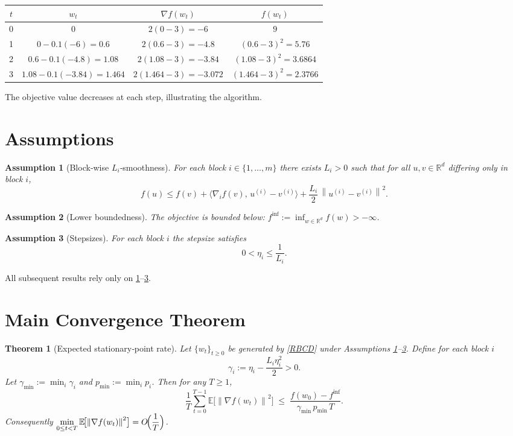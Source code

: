 \documentclass{article}
\newtheorem{theorem}{Theorem}
\newtheorem{assumption}{Assumption}
\newcommand{\E}{\mathbb{E}}
\newcommand{\R}{\mathbb{R}}
\newcommand{\norm}[1]{\left\lVert #1\right\rVert}
\begin{document}
\begin{center}
\begin{tabular}{c|c|c|c}
$t$ & $w_t$ & $\nabla f(w_t)$ & $f(w_t)$\\ \hline
0 & $0$ & $2(0-3)=-6$ & $9$\\
1 & $0-0.1(-6)=0.6$ & $2(0.6-3)=-4.8$ & $(0.6-3)^2=5.76$\\
2 & $0.6-0.1(-4.8)=1.08$ & $2(1.08-3)=-3.84$ & $(1.08-3)^2=3.6864$\\
3 & $1.08-0.1(-3.84)=1.464$ & $2(1.464-3)=-3.072$ & $(1.464-3)^2=2.3766$
\end{tabular}
\end{center}
The objective value decreases at each step, illustrating the algorithm.

\newpage
\section*{Assumptions}
\begin{assumption}[Block‑wise $L_i$‑smoothness]\label{ass:smooth}
For each block $i\in\{1,\dots,m\}$ there exists $L_i>0$ such that for all
$u,v\in\R^{d}$ differing only in block $i$,
\[
f(u)\le f(v)+\langle\nabla_i f(v),\,u^{(i)}-v^{(i)}\rangle
+\frac{L_i}{2}\,\norm{u^{(i)}-v^{(i)}}^{2}.
\tag{A1}
\]
\end{assumption}
\begin{assumption}[Lower boundedness]\label{ass:lb}
The objective is bounded below: $f^{\inf}:=\inf_{w\in\R^{d}}f(w)>-\infty$.
\end{assumption}
\begin{assumption}[Stepsizes]\label{ass:steps}
For each block $i$ the stepsize satisfies
\[
0<\eta_i\le \frac{1}{L_i}.
\tag{A3}
\]
\end{assumption}
All subsequent results rely only on \ref{ass:smooth}–\ref{ass:steps}.

\section*{Main Convergence Theorem}
\begin{theorem}[Expected stationary‑point rate]\label{thm:main}
Let $\{w_t\}_{t\ge0}$ be generated by \eqref{RBCD} under
Assumptions \ref{ass:smooth}–\ref{ass:steps}.
Define for each block $i$
\[
\gamma_i:=\eta_i-\frac{L_i\eta_i^{2}}{2}>0 .
\]
Let $\gamma_{\min}:=\min_{i}\gamma_i$ and $p_{\min}:=\min_{i}p_i$.
Then for any $T\ge1$,
\[
\frac{1}{T}\sum_{t=0}^{T-1}\E\!\bigl[\norm{\nabla f(w_t)}^{2}\bigr]
\;\le\;
\frac{f(w_0)-f^{\inf}}{\gamma_{\min}\,p_{\min}\,T}.
\tag{T1}
\]
Consequently $\displaystyle \min_{0\le t<T}\E\!\bigl[\norm{\nabla f(w_t)}^{2}\bigr]=O\!\Bigl(\frac{1}{T}\Bigr)$.
\end{theorem}
\end{document}
